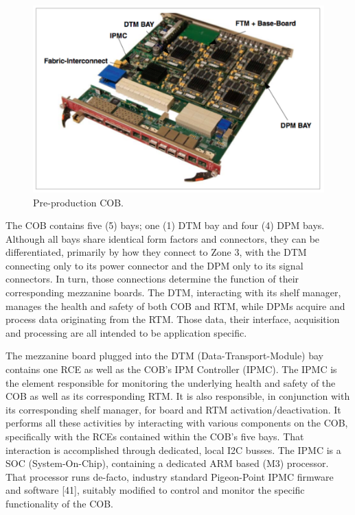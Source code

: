 \begin{figure}[tbh]
\includegraphics[scale=0.8]{cob-photo.pdf}
\caption{Pre-production COB.  }
\label{fig:cob}
\end{figure} 


The COB contains five (5) bays; one (1) DTM bay and four (4) DPM bays. Although all bays share identical form factors and connectors, they can be differentiated, primarily by how they connect to Zone 3, with the DTM connecting only to its power connector and the DPM only to its signal connectors. In turn, those connections determine the function of their corresponding mezzanine boards. The DTM, interacting with its shelf manager, manages the health and safety of both COB and RTM, while DPMs acquire and process data originating from the RTM. Those data, their interface, acquisition and processing are all intended to be application specific.

The mezzanine board plugged into the DTM (Data-Transport-Module) bay contains one RCE as well as the COB's IPM Controller (IPMC). The IPMC is the element responsible for monitoring the underlying health and safety of the COB as well as its corresponding RTM. It is also responsible, in conjunction with its corresponding shelf manager, for board and RTM activation/deactivation. It performs all these activities by interacting with various components on the COB, specifically with the RCEs contained within the COB's five bays. That interaction is accomplished through dedicated, local I2C busses. The IPMC is a SOC (System-On-Chip), containing a dedicated ARM based (M3) processor. That processor runs de-facto, industry standard Pigeon-Point IPMC firmware and software [41], suitably modified to control and monitor the specific functionality of the COB.


